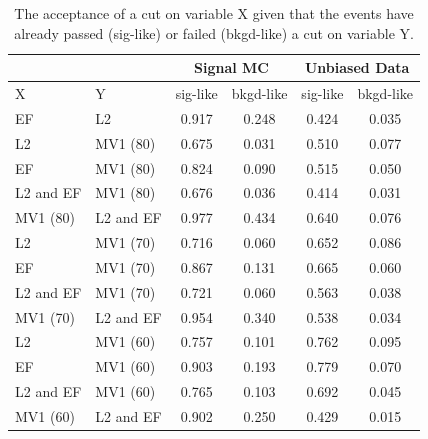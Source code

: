   \begin{table}[hbt]
\caption{  The acceptance of a cut on variable X given that the events have
  already passed (sig-like) or failed (bkgd-like) a cut on variable Y.\label{tab:online_offline_btag}}
    
    \begin{center}
    \begin{tabular}{l | l | c | c || c | c } \hline \hline
    \multicolumn{2}{c}{}  & \multicolumn{2}{c}{Signal MC} & \multicolumn{2}{c}{Unbiased Data} \\ \hline
      X         & Y         & sig-like & bkgd-like   &   sig-like & bkgd-like \\
      \hline
      EF        & L2        & 0.917    & 0.248 &   0.424       & 0.035 \\
      \hline
      L2        & MV1 (80)  & 0.675    & 0.031 &       0.510       & 0.077 \\
      EF        & MV1 (80)  & 0.824    & 0.090 & 0.515       & 0.050\\
      L2 and EF & MV1 (80)  & 0.676    & 0.036 & 0.414       & 0.031 \\
      MV1 (80)  & L2 and EF & 0.977    & 0.434 & 0.640       & 0.076 \\
      \hline
      L2        & MV1 (70)  & 0.716    & 0.060 & 0.652       & 0.086\\
      EF        & MV1 (70)  & 0.867    & 0.131 & 0.665       & 0.060 \\
      L2 and EF & MV1 (70)  & 0.721    & 0.060 & 0.563       & 0.038\\
      MV1 (70)  & L2 and EF & 0.954    & 0.340 & 0.538       & 0.034\\
      \hline
      L2        & MV1 (60)  & 0.757    & 0.101 & 0.762       & 0.095\\
      EF        & MV1 (60)  & 0.903    & 0.193 & 0.779       & 0.070 \\
      L2 and EF & MV1 (60)  & 0.765    & 0.103 & 0.692       & 0.045\\
      MV1 (60)  & L2 and EF & 0.902    & 0.250 & 0.429       & 0.015\\ \hline
    \end{tabular}
    \\
    \vspace{2mm}
    \end{center}
  \end{table}
  


